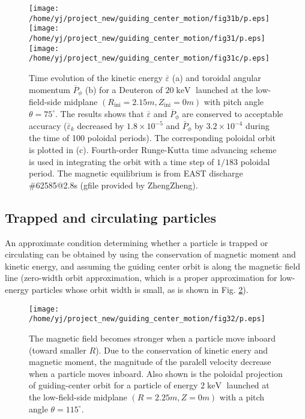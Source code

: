 \documentclass{article}
\newcommand{\tmop}[1]{\ensuremath{\operatorname{#1}}}
\begin{document}
\begin{figure}[h]
  \texttt{[image: /home/yj/project\_new/guiding\_center\_motion/fig31b/p.eps]}\texttt{[image: /home/yj/project\_new/guiding\_center\_motion/fig31/p.eps]}\texttt{[image: /home/yj/project\_new/guiding\_center\_motion/fig31c/p.eps]}
  \caption{\label{8-10-e1}Time evolution of the kinetic energy
  $\overline{\varepsilon}$ (a) and toroidal angular momentum
  $\overline{P}_{\phi}$ (b) for a Deuteron of $20 \tmop{keV}$ launched at the
  low-field-side midplane $(R_{\tmop{ini}} = 2.15 m, Z_{\tmop{ini}} = 0 m)$
  with pitch angle $\theta = 75^{\circ}$. The results shows that
  $\overline{\varepsilon}$ and $\overline{P}_{\phi}$ are conserved to
  acceptable accuracy ($\overline{\varepsilon}_k$ decreased by $1.8 \times
  10^{- 5}$ and $\bar{P}_{\phi}$ by $3.2 \times 10^{- 4}$ during the time of
  100 poloidal periods). The corresponding poloidal orbit is plotted in (c).
  Fourth-order Runge-Kutta time advancing scheme is used in integrating the
  orbit with a time step of $1 / 183$ poloidal period. The magnetic
  equilibrium is from EAST discharge \#62585@2.8s (gfile provided by
  ZhengZheng).}
\end{figure}

\subsection{Trapped and circulating particles}\label{15-9-25-1}

An approximate condition determining whether a particle is trapped or
circulating can be obtained by using the conservation of magnetic moment and
kinetic energy, and assuming the guiding center orbit is along the magnetic
field line (zero-width orbit approximation, which is a proper approximation
for low-energy particles whose orbit width is small, as is shown in Fig.
\ref{16-7-12-1}).

\begin{figure}[h]
  \texttt{[image: /home/yj/project\_new/guiding\_center\_motion/fig32/p.eps]}
  \caption{\label{16-7-12-1}The magnetic field becomes stronger when a
  particle move inboard (toward smaller $R$). Due to the conservation of
  kinetic enery and magnetic moment, the magnitude of the paralell velocity
  decrease when a particle moves inboard. Also shown is the poloidal
  projection of guiding-center orbit for a particle of energy $2 \tmop{keV}$
  launched at the low-field-side midplane $(R = 2.25 m, Z = 0 m)$ with a pitch
  angle $\theta = 115^{\circ}$.}
\end{figure}
\end{document}
